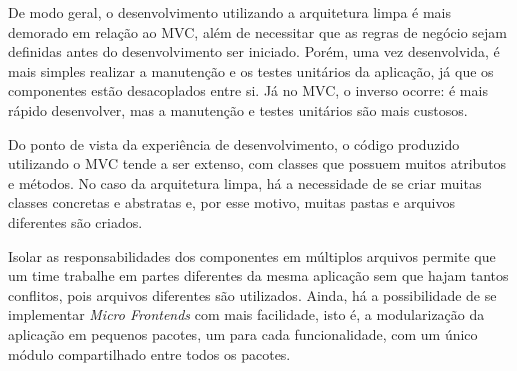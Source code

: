 De modo geral, o desenvolvimento utilizando a arquitetura limpa é mais demorado em relação ao MVC, além de necessitar que as regras de negócio sejam definidas antes do desenvolvimento ser iniciado.
Porém, uma vez desenvolvida, é mais simples realizar a manutenção e os testes unitários da aplicação, já que os componentes estão desacoplados entre si.
Já no MVC, o inverso ocorre: é mais rápido desenvolver, mas a manutenção e testes unitários são mais custosos.

Do ponto de vista da experiência de desenvolvimento, o código produzido utilizando o MVC tende a ser extenso, com classes que possuem muitos atributos e métodos.
No caso da arquitetura limpa, há a necessidade de se criar muitas classes concretas e abstratas e, por esse motivo, muitas pastas e arquivos diferentes são criados.

Isolar as responsabilidades dos componentes em múltiplos arquivos permite que um time trabalhe em partes diferentes da mesma aplicação sem que hajam tantos conflitos, pois arquivos diferentes são utilizados.
Ainda, há a possibilidade de se implementar \emph{Micro Frontends} com mais facilidade, isto é, a modularização da aplicação em pequenos pacotes, um para cada funcionalidade, com um único módulo compartilhado entre todos os pacotes.